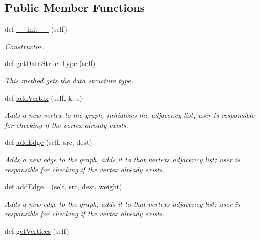 \subsection*{Public Member Functions}
\begin{DoxyCompactItemize}
\item 
def \hyperlink{class_graph_adj_list_1_1_graph_adj_list_a045be8de7a7695b8eac07feb9011b73d}{\+\_\+\+\_\+init\+\_\+\+\_\+} (self)
\begin{DoxyCompactList}\small\item\em Constructor. \end{DoxyCompactList}\item 
def \hyperlink{class_graph_adj_list_1_1_graph_adj_list_a19fd235cb56eaaf5335331088bb52c37}{get\+Data\+Struct\+Type} (self)
\begin{DoxyCompactList}\small\item\em This method gets the data structure type. \end{DoxyCompactList}\item 
def \hyperlink{class_graph_adj_list_1_1_graph_adj_list_ab2f7025978821c01436cc773957bb9c5}{add\+Vertex} (self, k, e)
\begin{DoxyCompactList}\small\item\em Adds a new vertex to the graph, initializes the adjacency list; user is responsible for checking if the vertex already exists. \end{DoxyCompactList}\item 
def \hyperlink{class_graph_adj_list_1_1_graph_adj_list_a52d80ff8e432cabad99cc77feb82a295}{add\+Edge} (self, src, dest)
\begin{DoxyCompactList}\small\item\em Adds a new edge to the graph, adds it to that vertex\textquotesingle{}s adjacency list; user is responsible for checking if the vertex already exists. \end{DoxyCompactList}\item 
def \hyperlink{class_graph_adj_list_1_1_graph_adj_list_a33234517232ecd8a4fab8ded3dcdd85d}{add\+Edge\+\_} (self, src, dest, weight)
\begin{DoxyCompactList}\small\item\em Adds a new edge to the graph, adds it to that vertex\textquotesingle{}s adjacency list; user is responsible for checking if the vertex already exists. \end{DoxyCompactList}\item 
def \hyperlink{class_graph_adj_list_1_1_graph_adj_list_a5921cc09aba4d4b61d5cb5e97ee6473f}{get\+Vertices} (self)

\end{DoxyCompactItemize}
